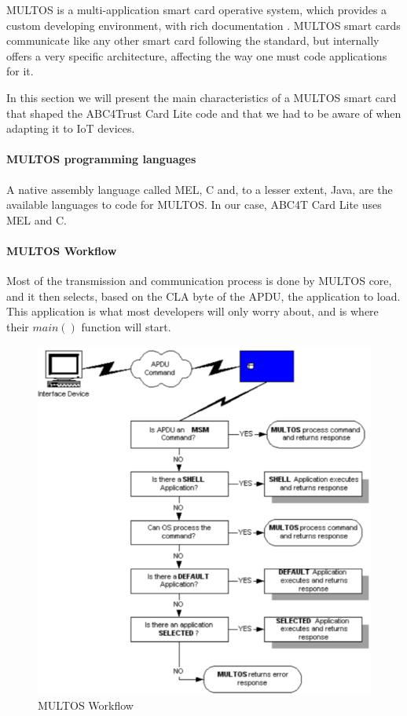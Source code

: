 MULTOS is a multi-application smart card operative system, which provides a custom developing environment, with rich documentation \citep{MultosTechLib}. MULTOS smart cards communicate like any other smart card following the standard, but internally offers a very specific architecture, affecting the way one must code applications for it.

In this section we will present the main characteristics of a MULTOS smart card that shaped the ABC4Trust Card Lite code and that we had to be aware of when adapting it to IoT devices.

\paragraph{MULTOS programming languages} A native assembly language called MEL, C and, to a lesser extent, Java, are the available languages to code for MULTOS. In our case, ABC4T Card Lite uses MEL and C.

\paragraph{MULTOS Workflow}

Most of the transmission and communication process is done by MULTOS core, and it then selects, based on the CLA byte of the APDU, the application to load. This application is what most developers will only worry about, and is where their $main()$ function will start.

\begin{figure}[bth]
	\begin{center}
		\includegraphics[width=0.6\linewidth]{gfx/multosWorkflow}
	\end{center}
	\caption{MULTOS Workflow}
	\label{fig:multosWorkflow}
\end{figure}

